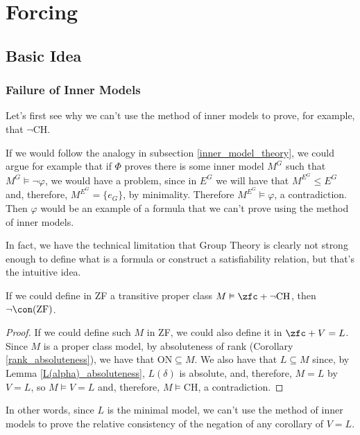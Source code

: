 \chapter{Forcing}

\section{Basic Idea}

\subsection{Failure of Inner Models}

Let's first see why we can't use the method of inner models to prove, for example, that $\neg\text{CH}$.

If we would follow the analogy in subsection \ref{inner_model_theory}, we could argue for example that if $\Phi$ proves there is some inner model $M^G$ such that $M^G\vDash\neg\varphi$, we would have a problem, since in $E^G$ we will have that $M^{E^G}\leq E^G$ and, therefore, $M^{E^G}=\{e_G\}$, by minimality. Therefore $M^{E^G}\vDash\varphi$, a contradiction. Then $\varphi$ would be an example of a formula that we can't prove using the method of inner models.

In fact, we have the technical limitation that Group Theory is clearly not strong enough to define what is a formula or construct a satisfiability relation, but that's the intuitive idea.

\begin{observation}
    If we could define in ZF a transitive proper class $M\vDash\zfc+\neg\text{CH}$, then $\neg\con(\text{ZF})$.
\end{observation}

\begin{proof}
    If we could define such $M$ in ZF, we could also define it in $\zfc+V=L$. Since $M$ is a proper class model, by absoluteness of rank (Corollary \ref{rank_absoluteness}), we have that $\text{ON}\subseteq M$. We also have that $L\subseteq M$ since, by Lemma \ref{L(alpha)_absoluteness}, $L(\delta)$ is absolute, and, therefore, $M=L$ by $V=L$, so $M\vDash V=L$ and, therefore, $M\vDash\text{CH}$, a contradiction.
\end{proof}

In other words, since $L$ is the minimal model, we can't use the method of inner models to prove the relative consistency of the negation of any corollary of $V=L$.

